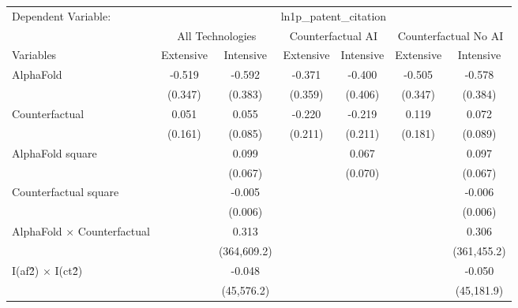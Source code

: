 \begingroup
\centering
\begin{tabular}{lcccccc}
   \tabularnewline \midrule \midrule
   Dependent Variable: & \multicolumn{6}{c}{ln1p\_patent\_citation}\\
 & \multicolumn{2}{c}{All Technologies} & \multicolumn{2}{c}{Counterfactual AI} & \multicolumn{2}{c}{Counterfactual No AI} \\
\cmidrule(lr){1-1}\cmidrule(lr){2-3} \cmidrule(lr){4-5} \cmidrule(lr){6-7}
Variables & \multicolumn{1}{c}{Extensive} & \multicolumn{1}{c}{Intensive} & \multicolumn{1}{c}{Extensive} & \multicolumn{1}{c}{Intensive} & \multicolumn{1}{c}{Extensive} & \multicolumn{1}{c}{Intensive} \\
\cmidrule(lr){1-1}\cmidrule(lr){2-2} \cmidrule(lr){3-3} \cmidrule(lr){4-4} \cmidrule(lr){5-5} \cmidrule(lr){6-6} \cmidrule(lr){7-7}
   AlphaFold                          & -0.519  & -0.592      & -0.371  & -0.400  & -0.505  & -0.578\\   
                                      & (0.347) & (0.383)     & (0.359) & (0.406) & (0.347) & (0.384)\\   
   Counterfactual                     & 0.051   & 0.055       & -0.220  & -0.219  & 0.119   & 0.072\\   
                                      & (0.161) & (0.085)     & (0.211) & (0.211) & (0.181) & (0.089)\\   
   AlphaFold square                   &         & 0.099       &         & 0.067   &         & 0.097\\   
                                      &         & (0.067)     &         & (0.070) &         & (0.067)\\   
   Counterfactual square              &         & -0.005      &         &         &         & -0.006\\   
                                      &         & (0.006)     &         &         &         & (0.006)\\   
   AlphaFold $\times$ Counterfactual  &         & 0.313       &         &         &         & 0.306\\   
                                      &         & (364,609.2) &         &         &         & (361,455.2)\\   
   I(af\^2) $\times$ I(ct\^2)         &         & -0.048      &         &         &         & -0.050\\   
                                      &         & (45,576.2)  &         &         &         & (45,181.9)\\   

\end{tabular}

